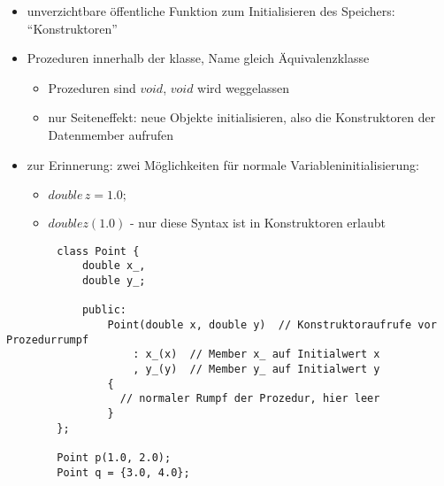 \documentclass{article}
\begin{document}
	 \begin{itemize}
	  	\item unverzichtbare öffentliche Funktion zum Initialisieren des Speichers: ``Konstruktoren''
	  	\item Prozeduren innerhalb der klasse, Name gleich Äquivalenzklasse
	  	\begin{itemize}
	  		\item Prozeduren sind $void$, $void$ wird weggelassen
	  		\item nur Seiteneffekt: neue Objekte initialisieren, also die Konstruktoren der Datenmember aufrufen
	  	\end{itemize}
	  	\item zur Erinnerung: zwei Möglichkeiten für normale Variableninitialisierung:
	  	\begin{itemize}
	  		\item $double \, z=1.0;$
	  		\item $double z(1.0)$ - nur diese Syntax ist in Konstruktoren erlaubt
	  	\end{itemize}
	 \end{itemize}

	 \begin{lstlisting}
	  	class Point {
	  		double x_,
	  		double y_;

	  		public:
	  			Point(double x, double y)  // Konstruktoraufrufe vor Prozedurrumpf
	  				: x_(x)  // Member x_ auf Initialwert x
	  				, y_(y)  // Member y_ auf Initialwert y
	  			{
	  			  // normaler Rumpf der Prozedur, hier leer
	  			}
	  	};

	  	Point p(1.0, 2.0);
	  	Point q = {3.0, 4.0};
	 \end{lstlisting}
\end{document}

